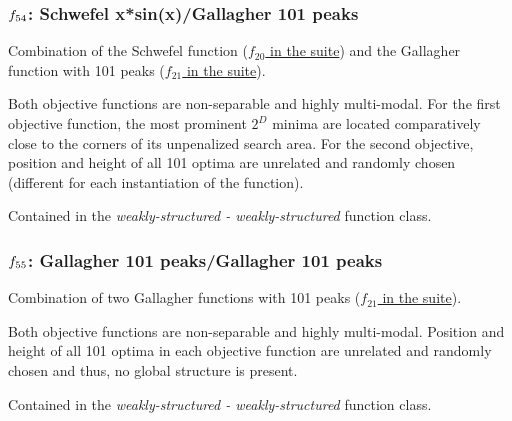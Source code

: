 \documentclass[letterpaper,12pt,english]{article}
\begin{document}
\subsubsection{\protect\(f_{54}\protect\): Schwefel x*sin(x)/Gallagher 101 peaks}
\label{index:f54}\label{index:schwefel-x-sin-x-gallagher-101-peaks}
Combination of the Schwefel function (\href{http://coco.lri.fr/downloads/download15.03/bbobdocfunctions.pdf\#page=100}{\(f_{20}\) in the  suite}) and the Gallagher function with
101 peaks (\href{http://coco.lri.fr/downloads/download15.03/bbobdocfunctions.pdf\#page=105}{\(f_{21}\) in the  suite}).

Both objective functions are non-separable and highly multi-modal.
For the first objective function, the most prominent \(2^D\) minima
are located comparatively close to the corners of its unpenalized search
area. For the second objective, position and height of all
101 optima are unrelated and randomly
chosen (different for each instantiation of the function).

Contained in the \emph{weakly-structured - weakly-structured} function class.


\subsubsection{\protect\(f_{55}\protect\): Gallagher 101 peaks/Gallagher 101 peaks}
\label{index:gallagher-101-peaks-gallagher-101-peaks}\label{index:f55}
Combination of two Gallagher functions with
101 peaks (\href{http://coco.lri.fr/downloads/download15.03/bbobdocfunctions.pdf\#page=105}{\(f_{21}\) in the  suite}).

Both objective functions are non-separable and highly multi-modal.
Position and height of all 101 optima in each objective function
are unrelated and randomly chosen and thus, no global structure
is present.

Contained in the \emph{weakly-structured - weakly-structured} function class.
\end{document}
